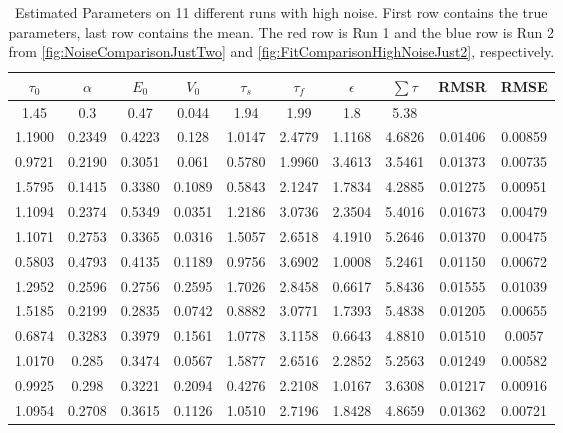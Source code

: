 \begin{table}[t]
\centering
\begin{tabular}{|c | c | c | c | c | c | c | c | c | c |}
\hline
$\tau_0$ & $\alpha$ & $E_0$    & $V_0$    & $\tau_s$ & $\tau_f$ & $\epsilon$  & $ \sum \tau $ & \acs{RMSR} & \acs{RMSE} \\
\hline
\rowcolor[gray]{.8}
1.45 & 0.3 & 0.47 & 0.044 & 1.94 & 1.99 & 1.8  & 5.38 &  & \\
\hline
\hline
1.1900 & 0.2349 & 0.4223 & 0.128  & 1.0147 & 2.4779 & 1.1168 & 4.6826 &0.01406 & 0.00859\\
0.9721 & 0.2190 & 0.3051 & 0.061  & 0.5780 & 1.9960 & 3.4613 & 3.5461 &0.01373 & 0.00735\\
1.5795 & 0.1415 & 0.3380 & 0.1089 & 0.5843 & 2.1247 & 1.7834 & 4.2885 &0.01275 & 0.00951\\
1.1094 & 0.2374 & 0.5349 & 0.0351 & 1.2186 & 3.0736 & 2.3504 & 5.4016 &0.01673 & 0.00479 \\
1.1071 & 0.2753 & 0.3365 & 0.0316 & 1.5057 & 2.6518 & 4.1910 & 5.2646 &0.01370 & 0.00475\\
0.5803 & 0.4793 & 0.4135 & 0.1189 & 0.9756 & 3.6902 & 1.0008 & 5.2461 &0.01150 & 0.00672\\
\rowcolor[rgb]{.9,.5,.5}
1.2952 & 0.2596 & 0.2756 & 0.2595 & 1.7026 & 2.8458 & 0.6617 & 5.8436 &0.01555 & 0.01039\\
\rowcolor[rgb]{.5,.5,.9}
1.5185 & 0.2199 & 0.2835 & 0.0742 & 0.8882 & 3.0771 & 1.7393 & 5.4838 &0.01205 & 0.00655\\
0.6874 & 0.3283 & 0.3979 & 0.1561 & 1.0778 & 3.1158 & 0.6643 & 4.8810 &0.01510 & 0.0057 \\
1.0170 & 0.285  & 0.3474 & 0.0567 & 1.5877 & 2.6516 & 2.2852 & 5.2563 &0.01249 & 0.00582\\
0.9925 & 0.298  & 0.3221 & 0.2094 & 0.4276 & 2.2108 & 1.0167 & 3.6308 &0.01217 & 0.00916\\
\hline
1.0954 & 0.2708 & 0.3615 & 0.1126 & 1.0510 & 2.7196 & 1.8428 & 4.8659 &0.01362 & 0.00721\\
\hline
\end{tabular}
\caption[Estimated Parameters on 11 different runs with high noise.]
{Estimated Parameters on 11 different runs with high noise. First row contains the true parameters,
last row contains the mean.
The red row is Run 1 and the blue row is Run 2 from  \autoref{fig:NoiseComparisonJustTwo}
and \autoref{fig:FitComparisonHighNoiseJust2}, respectively.}
\label{tab:HighNoiseResults}
\end{table}

